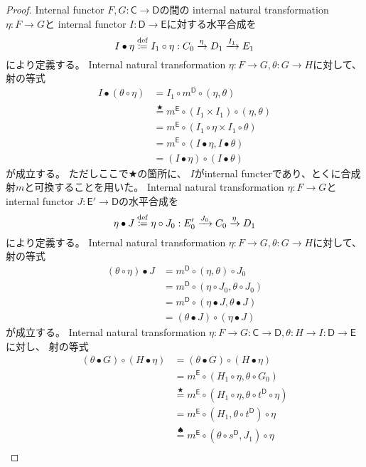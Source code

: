 \documentclass[uplatex]{jsarticle}
\theoremstyle{definition}
\def\msC{\mathsf{C}}
\def\msD{\mathsf{D}}
\def\msE{\mathsf{E}}
\newcommand{\dfn}{\overset{\mathrm{\tiny def}}{\coloneqq}}
\begin{document}
\begin{proof}
  Internal functor \(F,G: \msC\to \msD\)の間の
  internal natural transformation \(\eta:F\to G\)と
  internal functor \(I:\msD \to \msE\)に対する水平合成を
  \[
  I \bullet \eta \dfn I_1 \circ \eta : C_0 \xrightarrow{\eta} D_1 \xrightarrow{I_1} E_1
  \]
  により定義する。
  Internal natural transformation \(\eta:F\to G, \theta:G\to H\)に対して、
  射の等式
  \begin{align*}
    I \bullet (\theta \circ \eta)
    &= I_1\circ m^{\msD} \circ (\eta, \theta) \\
    &\overset{\bigstar}{=} m^{\msE} \circ (I_1 \times I_1 ) \circ (\eta, \theta) \\
    &= m^{\msE} \circ ( I_1 \circ \eta \times I_1 \circ \theta ) \\
    &= m^{\msE} \circ ( I \bullet \eta , I \bullet \theta ) \\
    &= ( I \bullet \eta ) \circ ( I \bullet \theta )
  \end{align*}
  が成立する。
  ただしここで\(\bigstar\)の箇所に、
  \(I\)がinternal functerであり、とくに合成射\(m\)と可換することを用いた。
  Internal natural transformation \(\eta:F\to G\)と
  internal functor \(J:\msE' \to \msD\)の水平合成を
  \[
  \eta \bullet J \dfn \eta \circ J_0 : E_0' \xrightarrow{J_0} C_0 \xrightarrow{\eta} D_1
  \]
  により定義する。
  Internal natural transformation \(\eta:F\to G, \theta:G\to H\)に対して、
  射の等式
  \begin{align*}
    (\theta\circ \eta) \bullet J
    &= m^{\msD} \circ (\eta, \theta) \circ J_0  \\
    &= m^{\msD} \circ (\eta\circ J_0, \theta\circ J_0)  \\
    &= m^{\msD} \circ (\eta\bullet J, \theta\bullet J)  \\
    &= (\theta\bullet J) \circ (\eta\bullet J)
  \end{align*}
  が成立する。
  Internal natural transformation
  \(\eta:F\to G: \msC\to \msD , \theta:H\to I:\msD\to \msE\)に対し、
  射の等式
  \begin{align*}
    (\theta \bullet G) \circ (H \bullet \eta)
    &= (\theta \bullet G) \circ (H \bullet \eta) \\
    &= m^{\msE} \circ (H_1 \circ \eta, \theta \circ G_0) \\
    &\overset{\bigstar}{=}
    m^{\msE} \circ (H_1 \circ \eta , \theta \circ t^{\msD}\circ \eta) \\
    &= m^{\msE} \circ (H_1 , \theta \circ t^{\msD} )\circ \eta \\
    &\overset{\spadesuit}{=}
    m^{\msE} \circ (\theta \circ s^{\msD}, J_1) \circ \eta \\

\end{align*}
\end{proof}
\end{document}
